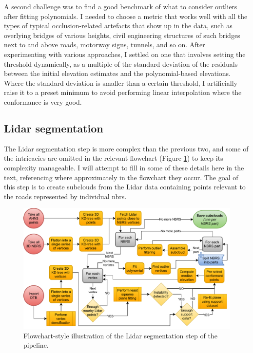 A second challenge was to find a good benchmark of what to consider outliers after fitting polynomials. I needed to choose a metric that works well with all the types of typical occlusion-related artefacts that show up in the data, such as overlying bridges of various heights, civil engineering structures of such bridges next to and above roads, motorway signs, tunnels, and so on. After experimenting with various approaches, I settled on one that involves setting the threshold dynamically, as a multiple of the standard deviation of the residuals between the initial elevation estimates and the polynomial-based elevations. Where the standard deviation is smaller than a certain threshold, I artificially raise it to a preset minimum to avoid performing linear interpolation where the conformance is very good.

\subsection{Lidar segmentation}
\label{sub:m_lidarsegmentation}

The Lidar segmentation step is more complex than the previous two, and some of the intricacies are omitted in the relevant flowchart (Figure \ref{fig:lidarsegmentationflow}) to keep its complexity manageable. I will attempt to fill in some of these details here in the text, referencing where approximately in the flowchart they occur. The goal of this step is to create subclouds from the Lidar data containing points relevant to the roads represented by individual \ac{nbrs}.

\begin{figure}
    \centering
    \includegraphics[width=\linewidth]{final_report/figs/lidar_segmentation.pdf}
    \caption{Flowchart-style illustration of the Lidar segmentation step of the pipeline.}
    \label{fig:lidarsegmentationflow}
\end{figure}

